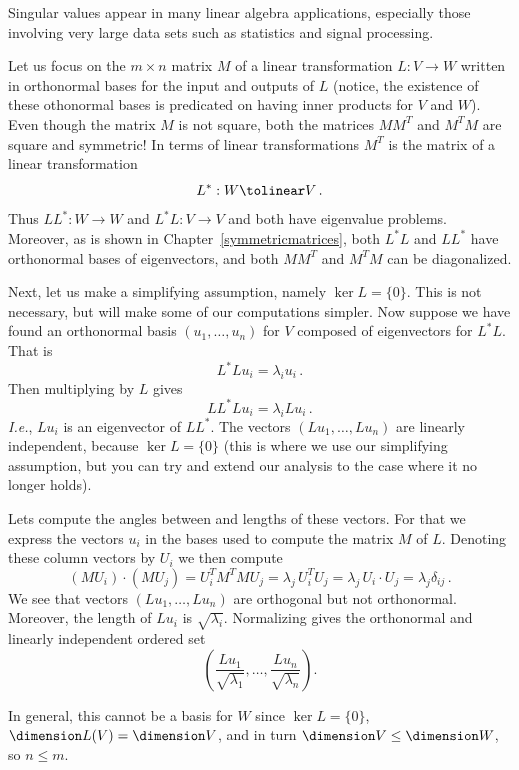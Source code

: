Singular values appear in many linear algebra applications, especially those involving very large data sets such as statistics and signal processing. 

Let us focus on the $m\times n$ matrix $M$ of a linear transformation $L:V\to W$ written in orthonormal bases for the input and outputs of $L$ (notice, the existence of these othonormal bases is predicated on having inner products for $V$ and $W$).
Even though the matrix $M$ is not square, both the matrices $M M^T$ and $M^T M$ are square and symmetric! 
In terms of linear transformations $M^T$ is the matrix of a linear transformation 
\[
L^*:W\tolinear V\, .
\]
Thus $LL^*:W\to W$ and $L^*L:V\to V$ and both have eigenvalue problems.
Moreover,  as is shown  in Chapter~\ref{symmetricmatrices},  both $L^*L$ and $LL^*$ have orthonormal bases of eigenvectors, and
 both $MM^T$ and $M^TM$ can be diagonalized. 
 
Next, let us make a simplifying assumption, namely $\ker L=\{0\}$. This is not necessary, but will make some of our computations simpler.
Now suppose we have found an orthonormal basis $(u_1,\ldots , u_n)$ for $V$ composed of eigenvectors for $L^*L$. That is 
\[
L^*L u_i= \lambda_i u_i\, .
\]
Then multiplying by $L$ gives 
\[
L L^* L u_i = \lambda_i L u_i\, .
\]
{\itshape I.e.}, $L u_i$ is an eigenvector of $L L^*$.
The vectors $(Lu_1,\ldots, Lu_n)$ are linearly independent, because $\ker L=\{0\}$ (this is where we use our simplifying assumption, but you can 
try and extend our analysis to the case where it no longer holds). 

Lets compute the angles between and lengths of these vectors. 
For that we express the vectors $u_i$ in the bases used to compute the matrix $M$ of $L$. Denoting these column vectors by $U_i$ we then compute
\[
(MU_i)\cdot (MU_j)=U_i^T M^T M U_j = \lambda_j \, U_i^T U_j=\lambda_j \, U_i\cdot U_j = \lambda_j \delta_{ij}\, .
\]
We see that  vectors $(Lu_1,\ldots, Lu_n)$ are orthogonal but not orthonormal. Moreover, the length of $Lu_i$ is $\sqrt{\lambda_i}$.
Normalizing gives the orthonormal and linearly independent ordered set
\[
\left(\frac{Lu_1}{\sqrt{\lambda_1}},\ldots,\frac{Lu_n}{\sqrt{\lambda_n}}\right).
\]

In general, this cannot be a basis for $W$ 
since $\ker L=\{0\}$, $\dimension L(V)=\dimension V$,
and in turn $\dimension V\leq \dimension W$, so $n\leq m$. 

